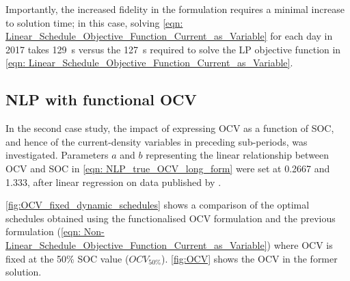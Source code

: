 \documentclass[preprint,3p,review,authoryear,10pt]{elsarticle}
\begin{document}
Importantly, the increased fidelity in the formulation requires a minimal increase to solution time; in this case, solving  \cref{eqn: Linear_Schedule_Objective_Function_Current_as_Variable} for each day in 2017 takes \SI{129}{\second} versus the \SI{127}{\second} required to solve the LP objective function in \cref{eqn: Linear_Schedule_Objective_Function_Current_as_Variable}.


\subsection{NLP with functional OCV}
\label{Results_NLP_Functional_OCV}
In the second case study, the impact of expressing OCV as a function of SOC, and hence of the current-density variables in preceding sub-periods, was investigated. Parameters $a$ and $b$ representing the linear relationship between OCV and SOC in \cref{eqn: NLP_true_OCV_long_form} were set at 0.2667 and 1.333, after linear regression on data published by \cite{Kim2011}. 

\cref{fig:OCV_fixed_dynamic_schedules} shows a comparison of the optimal schedules obtained using the functionalised OCV formulation and the previous formulation (\cref{eqn: Non-Linear_Schedule_Objective_Function_Current_as_Variable}) where OCV is fixed at the 50\% SOC value ($OCV_{50\%}$). \cref{fig:OCV} shows the OCV in the former solution.
\end{document}
